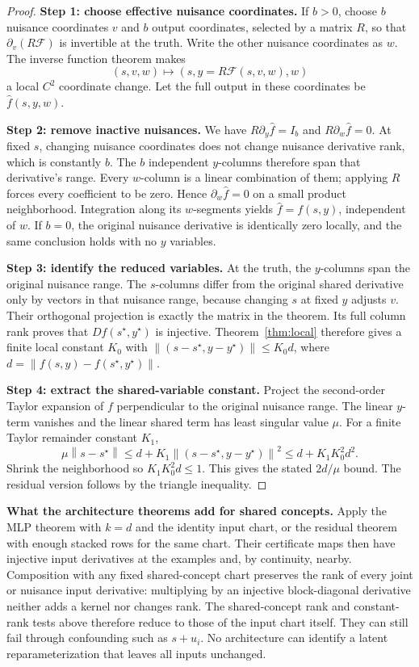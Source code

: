 \documentclass[12pt,a4paper]{article}
\theoremstyle{readable}
\theoremstyle{definition}\newtheorem{example}[theorem]{Example}
\newcommand{\norm}[1]{\left\|#1\right\|}
\begin{document}
\begin{proof}
\textbf{Step 1: choose effective nuisance coordinates.} If \(b>0\), choose \(b\) nuisance coordinates \(v\) and \(b\) output coordinates, selected by a matrix \(R\), so that \(\partial_v(R\mathcal F)\) is invertible at the truth. Write the other nuisance coordinates as \(w\). The inverse function theorem makes
\[
(s,v,w)\longmapsto(s,y=R\mathcal F(s,v,w),w)
\]
a local \(C^2\) coordinate change. Let the full output in these coordinates be \(\widehat f(s,y,w)\).

\textbf{Step 2: remove inactive nuisances.} We have \(R\partial_y\widehat f=I_b\) and \(R\partial_w\widehat f=0\). At fixed \(s\), changing nuisance coordinates does not change nuisance derivative rank, which is constantly \(b\). The \(b\) independent \(y\)-columns therefore span that derivative's range. Every \(w\)-column is a linear combination of them; applying \(R\) forces every coefficient to be zero. Hence \(\partial_w\widehat f=0\) on a small product neighborhood. Integration along its \(w\)-segments yields \(\widehat f=f(s,y)\), independent of \(w\). If \(b=0\), the original nuisance derivative is identically zero locally, and the same conclusion holds with no \(y\) variables.

\textbf{Step 3: identify the reduced variables.} At the truth, the \(y\)-columns span the original nuisance range. The \(s\)-columns differ from the original shared derivative only by vectors in that nuisance range, because changing \(s\) at fixed \(y\) adjusts \(v\). Their orthogonal projection is exactly the matrix in the theorem. Its full column rank proves that \(Df(s^\star,y^\star)\) is injective. Theorem~\ref{thm:local} therefore gives a finite local constant \(K_0\) with
\(\norm{(s-s^\star,y-y^\star)}\le K_0 d\), where \(d=\norm{f(s,y)-f(s^\star,y^\star)}\).

\textbf{Step 4: extract the shared-variable constant.} Project the second-order Taylor expansion of \(f\) perpendicular to the original nuisance range. The linear \(y\)-term vanishes and the linear shared term has least singular value \(\mu\). For a finite Taylor remainder constant \(K_1\),
\[
\mu\norm{s-s^\star}\le d+K_1\norm{(s-s^\star,y-y^\star)}^2
\le d+K_1K_0^2d^2.
\]
Shrink the neighborhood so \(K_1K_0^2d\le1\). This gives the stated \(2d/\mu\) bound. The residual version follows by the triangle inequality.
\end{proof}

\textbf{What the architecture theorems add for shared concepts.} Apply the MLP theorem with \(k=d\) and the identity input chart, or the residual theorem with enough stacked rows for the same chart. Their certificate maps then have injective input derivatives at the examples and, by continuity, nearby. Composition with any fixed shared-concept chart preserves the rank of every joint or nuisance input derivative: multiplying by an injective block-diagonal derivative neither adds a kernel nor changes rank. The shared-concept rank and constant-rank tests above therefore reduce to those of the input chart itself. They can still fail through confounding such as \(s+u_i\). No architecture can identify a latent reparameterization that leaves all inputs unchanged.
\end{document}
